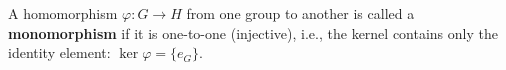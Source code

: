 A homomorphism $\varphi: G \to H$ from one group to another is called a \textbf{monomorphism} if it is one-to-one (injective), i.e., the kernel contains only the identity element: $\ker \varphi = \{e_G\}$.
